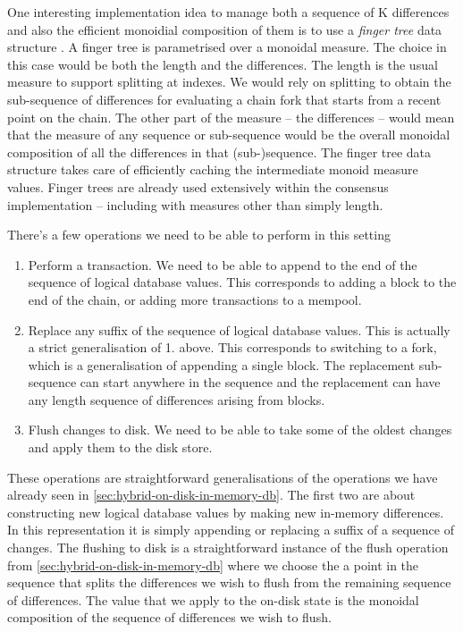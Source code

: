 \documentclass[11pt,a4paper]{article}
\begin{document}
One interesting implementation idea to manage both a sequence of K differences
and also the efficient monoidial composition of them is to use a \emph{finger
tree} data structure \citep{fingertree}. A finger tree is parametrised over a
monoidal measure. The choice in this case would be both the length and the
differences. The length is the usual measure to support splitting at indexes.
We would rely on splitting to obtain the sub-sequence of differences for
evaluating a chain fork that starts from a recent point on the chain. The other
part of the measure -- the differences -- would mean that the measure of any
sequence or sub-sequence would be the overall monoidal composition of all the
differences in that (sub-)sequence. The finger tree data structure takes care
of efficiently caching the intermediate monoid measure values. Finger trees are
already used extensively within the consensus implementation -- including with
measures other than simply length.

There's a few operations we need to be able to perform in this setting
\begin{enumerate}
\item Perform a transaction. We need to be able to append to the end of the
      sequence of logical database values. This corresponds to adding a block
      to the end of the chain, or adding more transactions to a mempool.
\item Replace any suffix of the sequence of logical database values. This is
      actually a strict generalisation of 1. above. This corresponds to
      switching to a fork, which is a generalisation of appending a single
      block. The replacement sub-sequence can start anywhere in the sequence and
      the replacement can have any length sequence of differences arising from
      blocks.
\item Flush changes to disk. We need to be able to take some of the oldest
      changes and apply them to the disk store.
\end{enumerate}
These operations are straightforward generalisations of the operations we have
already seen in \cref{sec:hybrid-on-disk-in-memory-db}. The first two are about
constructing new logical database values by making new in-memory differences.
In this representation it is simply appending or replacing a suffix of a
sequence of changes. The flushing to disk is a straightforward instance of the
flush operation from \cref{sec:hybrid-on-disk-in-memory-db} where we choose the
a point in the sequence that splits the differences we wish to flush from the
remaining sequence of differences. The value that we apply to the on-disk state
is the monoidal composition of the sequence of differences we wish to flush.
\end{document}
